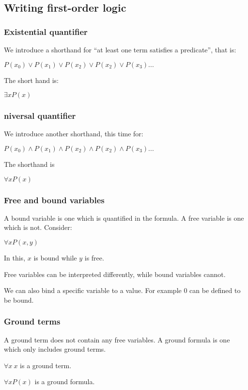 
\subsection{Writing first-order logic}

\subsubsection{Existential quantifier}

We introduce a shorthand for “at least one term satisfies a predicate”, that is:

\(P(x_0)\lor P(x_1)\lor P(x_2)\lor P(x_2)\lor P(x_3)...\)

The short hand is:

\(\exists x P(x)\)

\subsubsection{niversal quantifier}

We introduce another shorthand, this time for:

\(P(x_0)\land P(x_1)\land P(x_2)\land P(x_2)\land P(x_3)...\)

The shorthand is

\(\forall x P(x)\)

\subsubsection{Free and bound variables}

A bound variable is one which is quantified in the formula. A free variable is one which is not. Consider:

\(\forall x P(x,y)\)

In this, \(x\) is bound while \(y\) is free.

Free variables can be interpreted differently, while bound variables cannot.

We can also bind a specific variable to a value. For example \(0\) can be defined to be bound.

\subsubsection{Ground terms}

A ground term does not contain any free variables. A ground formula is one which only includes ground terms.

\(\forall x\ x\) is a ground term.

\(\forall x P(x)\) is a ground formula.

